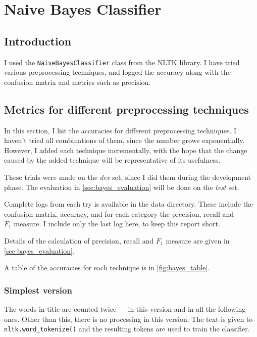 \section{Naive Bayes Classifier}
\label{sec:bayes}

\subsection{Introduction}

I used the \texttt{NaiveBayesClassifier} class from the NLTK library. I have tried various preprocessing techniques, and logged the accuracy along with the confusion matrix and metrics such as precision.

\subsection{Metrics for different preprocessing techniques}

In this section, I list the accuracies for different preprocessing techniques. I haven't tried all combinations of them, since the number grows exponentially. However, I added each technique incrementally, with the hope that the change caused by the added technique will be representative of its usefulness.

These trials were made on the \emph{dev} set, since I did them during the development phase. The evaluation in \autoref{sec:bayes_evaluation} will be done on the \emph{test} set.

Complete logs from each try is available in the data directory. These include the confusion matrix, accuracy, and for each category the precision, recall and $F_1\text{ measure}$. I include only the last log here, to keep this report short.

Details of the calculation of precision, recall and $F_1\text{ measure}$ are given in \autoref{sec:bayes_evaluation}.

A table of the accuracies for each technique is in \autoref{fig:bayes_table}.

\subsubsection{Simplest version}
\label{sec:bayes_simplest}

The words in title are counted twice --- in this version and in all the following ones. Other than this, there is no processing in this version. The text is given to \texttt{nltk.word_tokenize()} and the resulting tokens are used to train the classifier.

